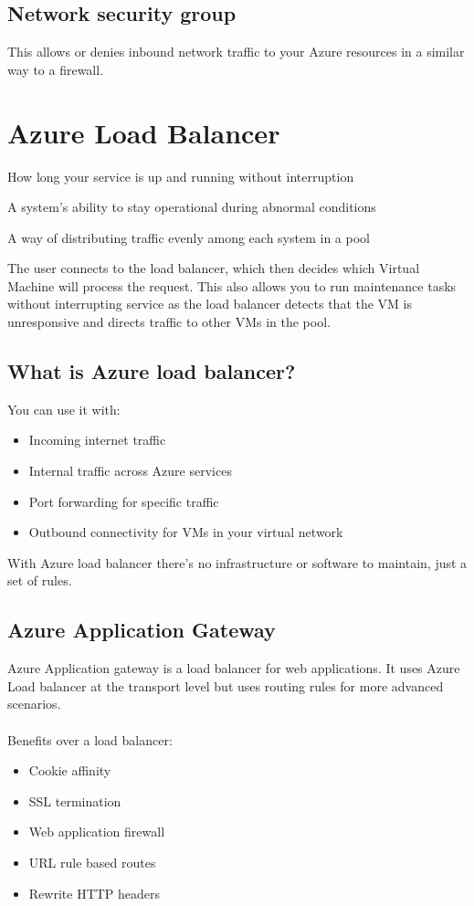 \documentclass{article}[18pt]
\begin{document}
\subsection{Network security group}
This allows or denies inbound network traffic to your Azure resources in a similar way to a firewall.
\section{Azure Load Balancer}
\begin{definition}[Availability]
	How long your service is up and running without interruption
\end{definition}
\begin{definition}[Resiliency]
	A system's ability to stay operational during abnormal conditions
\end{definition}
\begin{definition}
	A way of distributing traffic evenly among each system in a pool
\end{definition}
The user connects to the load balancer, which then decides which Virtual Machine will process the request. This also allows you to run maintenance tasks without interrupting service as the load balancer detects that the VM is unresponsive and directs traffic to other VMs in the pool. 
\subsection{What is Azure load balancer?}
You can use it with:
\begin{itemize}
	\item Incoming internet traffic
	\item Internal traffic across Azure services
	\item Port forwarding for specific traffic
	\item Outbound connectivity for VMs in your virtual network
\end{itemize}
With Azure load balancer there's no infrastructure or software to maintain, just a set of rules.
\subsection{Azure Application Gateway}
Azure Application gateway is a load balancer for web applications. It uses Azure Load balancer at the transport level but uses routing rules for more advanced scenarios.\\
\\
Benefits over a load balancer:
\begin{itemize}
	\item Cookie affinity
	\item SSL termination
	\item Web application firewall
	\item URL rule based routes
	\item Rewrite HTTP headers
\end{itemize}
\end{document}
